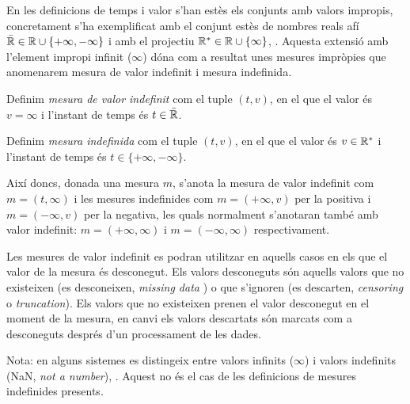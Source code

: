 En les definicions de temps i valor s'han estès els conjunts amb
valors impropis, concretament s'ha exemplificat amb el conjunt estès
de nombres reals afí $\bar{\mathbb{R}{}} \in \mathbb{R}{} \cup
\{+\infty,-\infty\}$ i amb el projectiu $\mathbb{R}{}^*\in\mathbb{R}{}
\cup\{\infty\}$,
\parencite{cantrell:extendedreal,cantrell:projectivelyextendedreal}. Aquesta
extensió amb l'element impropi infinit ($\infty$) dóna com a resultat
unes mesures impròpies que anomenarem mesura de valor indefinit i
mesura indefinida. 

\begin{definition}
  \label{def:model:mesura_valor_indefinit}
  Definim \emph{mesura de valor indefinit} com el tuple $(t,v)$, en el
  que el valor és $v=\infty$ i l'instant de temps és
  $t\in\bar{\mathbb{R}{}}$.
\end{definition}

\begin{definition}
  \label{def:model:mesura_indefinida}
  Definim \emph{mesura indefinida} com el tuple $(t,v)$, en el que el
  valor és $v\in\mathbb{R}{}^*$ i l'instant de temps és
  $t\in\{+\infty,-\infty\}$.
\end{definition}

Així doncs, donada una mesura $m$, s'anota la mesura de valor
indefinit com $m=(t,\infty)$ i les mesures indefinides com
$m=(+\infty,v)$ per la positiva i $m=(-\infty,v)$ per la negativa, les
quals normalment s'anotaran també amb valor indefinit:
$m=(+\infty,\infty)$ i $m=(-\infty,\infty)$ respectivament.


Les mesures de valor indefinit es podran utilitzar en aquells casos en
els que el valor de la mesura és desconegut. Els valors desconeguts
són aquells valors que no existeixen (es desconeixen, \emph{missing
  data} ) o que s'ignoren (es descarten, \emph{censoring} o
\emph{truncation}). Els valors que no existeixen prenen el valor
desconegut en el moment de la mesura, en canvi els valors descartats
són marcats com a desconeguts després d'un processament de les dades.

Nota: en alguns sistemes es distingeix entre valors infinits
($\infty$) i valors indefinits (NaN, \emph{not a number}),
\cite{wiki:ieee754}. Aquest no és el cas de les definicions de mesures
indefinides presents.







